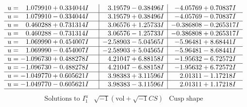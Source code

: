 \documentclass[1p]{elsarticle_modified}
\theoremstyle{definition}
\newcommand{\I}{\sqrt{-1}}
\begin{document}
$$\begin{array}{c|c|c}
\begin{aligned}
u &= \phantom{-}1.079910 + 0.334044 I\end{aligned}
 & \phantom{-}3.19579 - 0.38496 I & -4.05769 + 0.70837 I \\ \hline\begin{aligned}
u &= \phantom{-}1.079910 - 0.334044 I\end{aligned}
 & \phantom{-}3.19579 + 0.38496 I & -4.05769 - 0.70837 I \\ \hline\begin{aligned}
u &= \phantom{-}0.460288 + 0.731314 I\end{aligned}
 & \phantom{-}3.06576 + 1.25733 I & -0.386808 - 0.265317 I \\ \hline\begin{aligned}
u &= \phantom{-}0.460288 - 0.731314 I\end{aligned}
 & \phantom{-}3.06576 - 1.25733 I & -0.386808 + 0.265317 I \\ \hline\begin{aligned}
u &= \phantom{-}1.069990 + 0.454007 I\end{aligned}
 & -2.58903 - 5.04565 I & -5.96481 + 8.68441 I \\ \hline\begin{aligned}
u &= \phantom{-}1.069990 - 0.454007 I\end{aligned}
 & -2.58903 + 5.04565 I & -5.96481 - 8.68441 I \\ \hline\begin{aligned}
u &= -1.096730 + 0.488278 I\end{aligned}
 & \phantom{-}4.21047 + 6.88158 I & -1.95632 - 6.72572 I \\ \hline\begin{aligned}
u &= -1.096730 - 0.488278 I\end{aligned}
 & \phantom{-}4.21047 - 6.88158 I & -1.95632 + 6.72572 I \\ \hline\begin{aligned}
u &= -1.049770 + 0.605621 I\end{aligned}
 & \phantom{-}3.98383 + 3.11596 I & \phantom{-}2.01311 - 1.17218 I \\ \hline\begin{aligned}
u &= -1.049770 - 0.605621 I\end{aligned}
 & \phantom{-}3.98383 - 3.11596 I & \phantom{-}2.01311 + 1.17218 I\\
 \hline 
 \end{array}$$\newpage$$\begin{array}{c|c|c}  
\text{Solutions to }I^u_{1}& \I (\text{vol} + \sqrt{-1}CS) & \text{Cusp shape}\\

\end{array}$$
\end{document}

